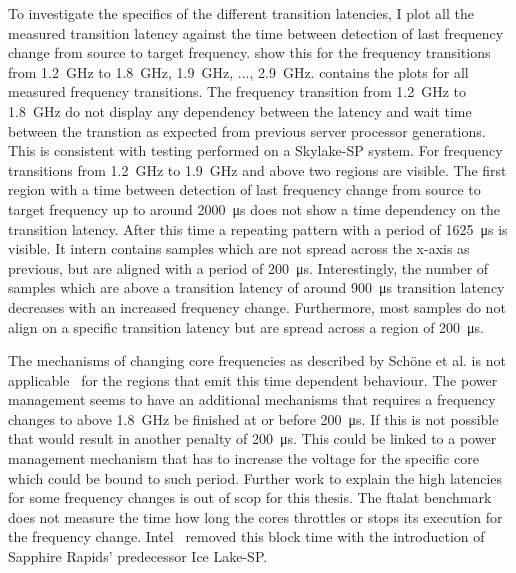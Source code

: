 To investigate the specifics of the different transition latencies, I plot all the measured transition latency against the time between detection of last frequency change from source to target frequency.
 show this for the frequency transitions from \SI{1.2}{\GHz} to \SI{1.8}{\GHz}, \SI{1.9}{\GHz}, ..., \SI{2.9}{\GHz}.
 contains the plots for all measured frequency transitions.
The frequency transition from \SI{1.2}{\GHz} to \SI{1.8}{\GHz} do not display any dependency between the latency and wait time between the transtion as expected from previous server processor generations.
This is consistent with testing performed on a Skylake-SP system.
For frequency transitions from \SI{1.2}{\GHz} to \SI{1.9}{\GHz} and above two regions are visible.
The first region with a time between detection of last frequency change from source to target frequency up to around \SI{2000}{\us} does not show a time dependency on the transition latency.
After this time a repeating pattern with a period of \SI{1625}{\us} is visible.
It intern contains samples which are not spread across the x-axis as previous, but are aligned with a period of \SI{200}{\us}.
Interestingly, the number of samples which are above a transition latency of around \SI{900}{\us} transition latency decreases with an increased frequency change.
Furthermore, most samples do not align on a specific transition latency but are spread across a region of \SI{200}{\us}.

The mechanisms of changing core frequencies as described by Schöne et al. is not applicable~\cite{Schoene_2019_SKL} for the regions that emit this time dependent behaviour.
The power management seems to have an additional mechanisms that requires a frequency changes to above \SI{1.8}{\GHz} be finished at or before \SI{200}{\us}.
If this is not possible that would result in another penalty of \SI{200}{\us}.
This could be linked to a power management mechanism that has to increase the voltage for the specific core which could be bound to such period.
Further work to explain the high latencies for some frequency changes is out of scop for this thesis.
The ftalat benchmark does not measure the time how long the cores throttles or stops its execution for the frequency change.
Intel~\cite{Intel_2020_IceLake_SP} removed this block time with the introduction of Sapphire Rapids' predecessor Ice Lake-SP.

